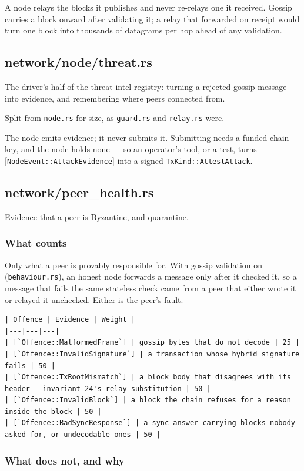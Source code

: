 \documentclass[11pt,a4paper]{article}
\begin{document}
A node relays the blocks it publishes and never re-relays one it received.
Gossip carries a block onward after validating it; a relay that forwarded
on receipt would turn one block into thousands of datagrams per hop ahead
of any validation.

\subsection{network/node/threat.rs}
The driver's half of the threat-intel registry: turning a rejected gossip
message into evidence, and remembering where peers connected from.

Split from \texttt{node.rs} for size, as \texttt{guard.rs} and \texttt{relay.rs} were.

The node emits evidence; it never submits it. Submitting needs a funded
chain key, and the node holds none — so an operator's tool, or a test, turns
[\texttt{NodeEvent::AttackEvidence}] into a signed \texttt{TxKind::AttestAttack}.

\subsection{network/peer\_health.rs}
Evidence that a peer is Byzantine, and quarantine.

\subsubsection{What counts}

Only what a peer is provably responsible for. With gossip validation on
(\texttt{behaviour.rs}), an honest node forwards a message only after it checked
it, so a message that fails the same stateless check came from a peer that
either wrote it or relayed it unchecked. Either is the peer's fault.

\begin{verbatim}
| Offence | Evidence | Weight |
|---|---|---|
| [`Offence::MalformedFrame`] | gossip bytes that do not decode | 25 |
| [`Offence::InvalidSignature`] | a transaction whose hybrid signature fails | 50 |
| [`Offence::TxRootMismatch`] | a block body that disagrees with its header — invariant 24's relay substitution | 50 |
| [`Offence::InvalidBlock`] | a block the chain refuses for a reason inside the block | 50 |
| [`Offence::BadSyncResponse`] | a sync answer carrying blocks nobody asked for, or undecodable ones | 50 |
\end{verbatim}

\subsubsection{What does not, and why}
\end{document}

